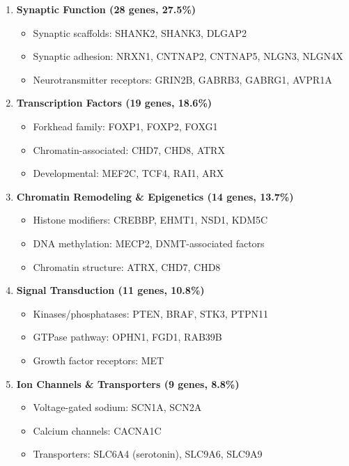 \documentclass[12pt]{article}
\begin{document}
\begin{enumerate}
\item \textbf{Synaptic Function (28 genes, 27.5\%)}
   \begin{itemize}
   \item Synaptic scaffolds: SHANK2, SHANK3, DLGAP2
   \item Synaptic adhesion: NRXN1, CNTNAP2, CNTNAP5, NLGN3, NLGN4X
   \item Neurotransmitter receptors: GRIN2B, GABRB3, GABRG1, AVPR1A
   \end{itemize}

\item \textbf{Transcription Factors (19 genes, 18.6\%)}
   \begin{itemize}
   \item Forkhead family: FOXP1, FOXP2, FOXG1
   \item Chromatin-associated: CHD7, CHD8, ATRX
   \item Developmental: MEF2C, TCF4, RAI1, ARX
   \end{itemize}

\item \textbf{Chromatin Remodeling \& Epigenetics (14 genes, 13.7\%)}
   \begin{itemize}
   \item Histone modifiers: CREBBP, EHMT1, NSD1, KDM5C
   \item DNA methylation: MECP2, DNMT-associated factors
   \item Chromatin structure: ATRX, CHD7, CHD8
   \end{itemize}

\item \textbf{Signal Transduction (11 genes, 10.8\%)}
   \begin{itemize}
   \item Kinases/phosphatases: PTEN, BRAF, STK3, PTPN11
   \item GTPase pathway: OPHN1, FGD1, RAB39B
   \item Growth factor receptors: MET
   \end{itemize}

\item \textbf{Ion Channels \& Transporters (9 genes, 8.8\%)}
   \begin{itemize}
   \item Voltage-gated sodium: SCN1A, SCN2A
   \item Calcium channels: CACNA1C
   \item Transporters: SLC6A4 (serotonin), SLC9A6, SLC9A9
   \end{itemize}


\end{enumerate}
\end{document}
